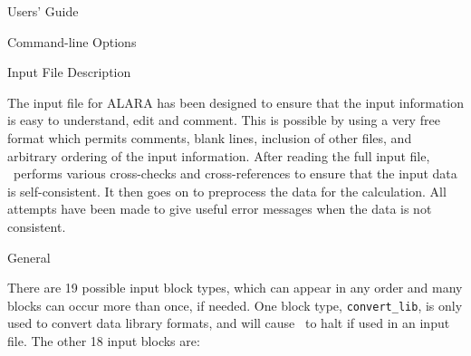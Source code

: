 \begin{chapter}{Users' Guide\label{app:user.guide}}
\begin{section}{Command-line Options}
  \end{section}
  
  
  \begin{section}{Input File Description\label{app:user.input}}
    
    The input file for ALARA has been designed to ensure that the
    input information is easy to understand, edit and comment.  This
    is possible by using a very free format which permits comments,
    blank lines, inclusion of other files, and arbitrary ordering of
    the input information.  After reading the full input file, \ALARA\
    performs various cross-checks and cross-references to ensure that
    the input data is self-consistent.  It then goes on to preprocess
    the data for the calculation.  All attempts have been made to give
    useful error messages when the data is not consistent.

    \begin{subsection}{General}
    
      There are 19 possible input block types, which can appear in any
      order and many blocks can occur more than once, if needed.  One
      block type, \texttt{convert\_lib}, is only used to convert data
      library formats, and will cause \ALARA\ to halt if used in an
      input file.  The other 18 input blocks are:


\end{subsection}
\end{section}
\end{chapter}
